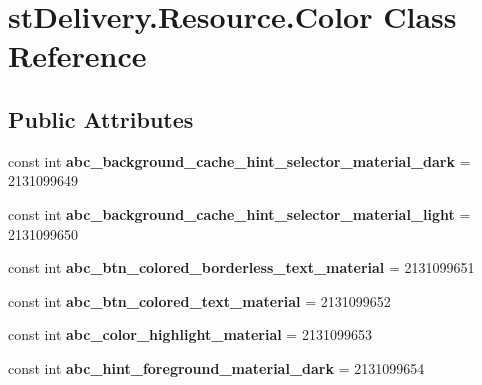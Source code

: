 \hypertarget{classst_delivery_1_1_resource_1_1_color}{}\section{st\+Delivery.\+Resource.\+Color Class Reference}
\label{classst_delivery_1_1_resource_1_1_color}
\subsection*{Public Attributes}
\begin{DoxyCompactItemize}
\item 
\mbox{\label{classst_delivery_1_1_resource_1_1_color_a027584f1d6b27db47381a0f149ba1b7e}} 
const int {\bfseries abc\+\_\+background\+\_\+cache\+\_\+hint\+\_\+selector\+\_\+material\+\_\+dark} = 2131099649
\item 
\mbox{\label{classst_delivery_1_1_resource_1_1_color_ae0b2ebc7cf8fa49f62df4fb97482a9ad}} 
const int {\bfseries abc\+\_\+background\+\_\+cache\+\_\+hint\+\_\+selector\+\_\+material\+\_\+light} = 2131099650
\item 
\mbox{\label{classst_delivery_1_1_resource_1_1_color_a11fed12cf4d2867bd9918b73addd9626}} 
const int {\bfseries abc\+\_\+btn\+\_\+colored\+\_\+borderless\+\_\+text\+\_\+material} = 2131099651
\item 
\mbox{\label{classst_delivery_1_1_resource_1_1_color_a12ec8199852cba09ae8d7c2e5c6b6647}} 
const int {\bfseries abc\+\_\+btn\+\_\+colored\+\_\+text\+\_\+material} = 2131099652
\item 
\mbox{\label{classst_delivery_1_1_resource_1_1_color_ab8f55fd471d74c1c6c7bdb475ed6efe7}} 
const int {\bfseries abc\+\_\+color\+\_\+highlight\+\_\+material} = 2131099653
\item 
\mbox{\label{classst_delivery_1_1_resource_1_1_color_ac2909087ee48ef36d0fdf7b580924e14}} 
const int {\bfseries abc\+\_\+hint\+\_\+foreground\+\_\+material\+\_\+dark} = 2131099654
\item 

\end{DoxyCompactItemize}
